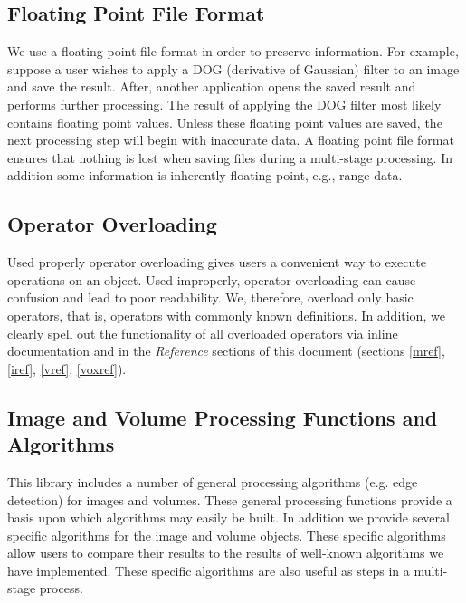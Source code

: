 \subsection{Floating Point File Format}
We use a floating point file format in order to preserve information.  
For example, suppose a user wishes to apply a DOG (derivative of 
Gaussian) filter to an image and save the result.  After, another 
application opens the saved result and performs further processing.  
The result of applying the DOG filter most likely contains floating 
point values.  Unless these floating point values are saved, the next 
processing step will begin with inaccurate data.  A floating point 
file format ensures that nothing is lost when saving files during a 
multi-stage processing.  In addition some information is inherently 
floating point, e.g., range data.

\subsection{Operator Overloading}
Used properly operator overloading gives users a convenient way to 
execute operations on an object.  Used improperly, operator 
overloading can cause confusion and lead to poor readability.  We, 
therefore, overload only basic operators, that is, operators with 
commonly known definitions.  In addition, we clearly spell out the 
functionality of all overloaded operators via inline documentation 
and in the {\em Reference} sections of this document (sections
\ref{mref}, \ref{iref}, \ref{vref}, \ref{voxref}).

\subsection{Image and Volume Processing Functions and Algorithms}
This library includes a number of general processing algorithms (e.g.  edge 
detection) for images and volumes.  These general processing functions 
provide a basis upon which algorithms may easily be built.  In 
addition we provide several specific algorithms for the image and 
volume objects.  These specific algorithms allow users to compare 
their results to the results of well-known algorithms we have 
implemented.  These specific algorithms are also useful as steps in a 
multi-stage process.

%
% 
%

